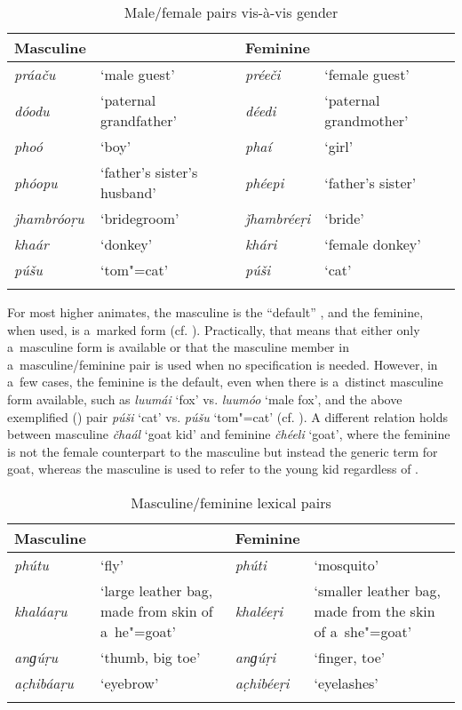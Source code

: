 \begin{table}[ht]
\caption{Male/female pairs vis-à-vis gender}
\begin{tabularx}{\textwidth}{ l Q l Q }
\lsptoprule
Masculine &
&
Feminine &
\\\hline
\textit{práaču} &
`male guest' &
\textit{préeči} &
`female guest'\\
\textit{dóodu} &
`paternal grandfather' &
\textit{déedi} &
`paternal grandmother'\\
\textit{phoó} &
`boy' &
\textit{phaí} &
`girl'\\
\textit{phóopu} &
`father's sister's husband' &
\textit{phéepi} &
`father's sister'\\
\textit{jhambróoṛu} &
`bridegroom' &
\textit{ǰhambréeṛi} &
`bride'\\
\textit{khaár} &
`donkey' &
\textit{khári} &
`female donkey'\\
\textit{púšu} &
`tom"=cat' &
\textit{púši} &
`cat'\\\lspbottomrule
\end{tabularx}
\label{tab:4-1}
\end{table}

For most higher animates, the masculine  is the ``default'' , and the feminine, when used, is a~marked form (cf. ). Practically, that means that either only a~masculine form is available or that the masculine member in a~masculine/feminine pair is used when no specification is needed. However, in a~few cases, the feminine is the default, even when there is a~distinct masculine form available, such as \textit{luumái} `fox' vs. \textit{luumóo} `male fox', and the above exemplified () pair \textit{púši} `cat' vs. \textit{púšu} `tom"=cat' (cf. \citealt[103--104]{dahl2000}). A different relation holds between masculine \textit{čhaál} `goat kid' and feminine \textit{čhéeli} `goat', where the feminine  is not the female counterpart to the masculine but instead the generic term for goat, whereas the masculine is used to refer to the young kid regardless of .


\begin{table}[ht]
\caption{Masculine/feminine lexical pairs}
\begin{tabularx}{\textwidth}{ l Q l Q }
\lsptoprule
Masculine &
&
Feminine &
\\\hline
\textit{phútu} &
`fly' &
\textit{phúti} &
`mosquito'\\
\textit{khaláaṛu}
&
`large leather bag, made from skin of a~he"=goat' &
\textit{khaléeṛi}
&
`smaller leather bag, made from the skin of a~she"=goat'\\
\textit{anɡúṛu} &
`thumb, big toe' &
\textit{anɡúṛi} &
`finger, toe'\\
\textit{ac̣hibáaṛu} &
`eyebrow' &
\textit{ac̣hibéeṛi} &
`eyelashes'\\\lspbottomrule
\end{tabularx}
\label{tab:4-2}
\end{table}

